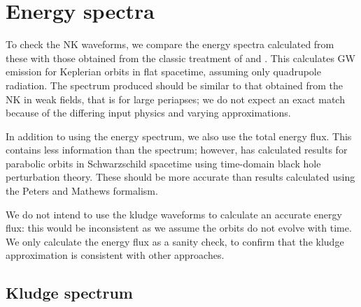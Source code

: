 \section{Energy spectra}\label{sec:Energy}

To check the NK waveforms, we compare the energy spectra calculated from these with those obtained from the classic treatment of \citet{Peters1963} and \citet{Peters1964}. This calculates GW emission for Keplerian orbits in flat spacetime, assuming only quadrupole radiation. The spectrum produced should be similar to that obtained from the NK in weak fields, that is for large periapses; we do not expect an exact match because of the differing input physics and varying approximations.

In addition to using the energy spectrum, we also use the total energy flux. This contains less information than the spectrum; however, \citet{Martel2004} has calculated results for parabolic orbits in Schwarzschild spacetime using time-domain black hole perturbation theory. These should be more accurate than results calculated using the Peters and Mathews formalism.

We do not intend to use the kludge waveforms to calculate an accurate energy flux: this would be inconsistent as we assume the orbits do not evolve with time. We only calculate the energy flux as a sanity check, to confirm that the kludge approximation is consistent with other approaches.

\subsection{Kludge spectrum}

